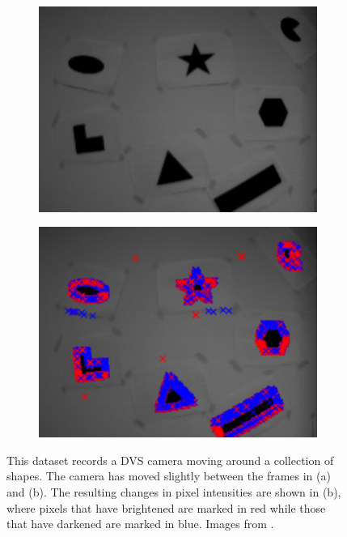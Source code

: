 \documentclass [MS] {UCLAthesis}
\begin{document}
\begin{figure}
     \centering
     \begin{subfigure}{0.41\textwidth}
         \centering
         \includegraphics[width=\textwidth]{dvs1}
         \caption{}
         \label{fig:dvs1}
     \end{subfigure}
     \hfill
     \begin{subfigure}{0.4\textwidth}
         \centering
         \includegraphics[width=\textwidth]{dvs2}
         \caption{}
         \label{fig:dvs2}
     \end{subfigure}
    \caption[Example data recorded from a DVS camera]{This dataset records a DVS camera moving around a collection of shapes. The camera has moved slightly between the frames in (a) and (b). The resulting changes in pixel intensities are shown in (b), where pixels that have brightened are marked in red while those that have darkened are marked in blue. Images from \citep{spiking_shapes}.}
    \label{fig:dvs_ex}
\end{figure}
\end{document}
